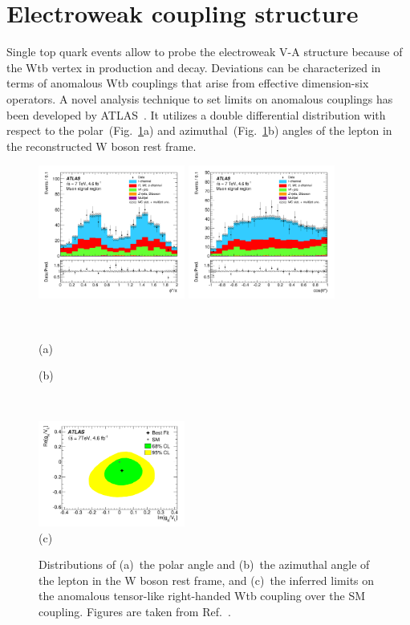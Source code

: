 \documentclass{PoS}
\begin{document}
\section{Electroweak coupling structure}
Single top quark events allow to probe the electroweak V-A structure because of the Wtb vertex in production and decay. Deviations can be characterized in terms of anomalous Wtb couplings that arise from effective dimension-six operators. A novel analysis technique to set limits on anomalous couplings has been developed by ATLAS~\cite{atlas-anomcoupl}. It utilizes a double differential distribution with respect to the polar~(Fig.~\ref{fig:angles}a) and azimuthal~(Fig.~\ref{fig:angles}b) angles of the lepton in the reconstructed W boson rest frame.

\begin{figure}[htbp]
\begin{center}
\parbox[t]{0.45\textwidth}{\centering\includegraphics[width=0.43\textwidth]{atlas_anomcoupl/phi.pdf}}
\parbox[t]{0.45\textwidth}{\centering\includegraphics[width=0.43\textwidth]{atlas_anomcoupl/theta.pdf}}\\
\parbox[t]{0.45\textwidth}{\centering (a)}
\parbox[t]{0.45\textwidth}{\centering (b)}\\\medskip
\parbox[t]{0.99\textwidth}{\centering\includegraphics[width=0.43\textwidth]{atlas_anomcoupl/limits.pdf}\\(c)}
\end{center}
\caption{\label{fig:angles}Distributions of (a)~the polar angle and (b)~the azimuthal angle of the lepton in the W boson rest frame, and (c)~the inferred limits on the anomalous tensor-like right-handed Wtb coupling over the SM coupling. Figures are taken from Ref.~\cite{atlas-anomcoupl}.}
\end{figure}
\end{document}
